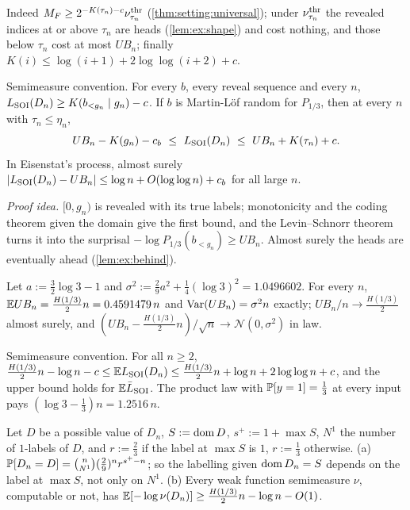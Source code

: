 Indeed $M_{F}\ge2^{-K(\tau_n)-c}\nu^{\rm thr}_{\tau_n}$ (\cref{thm:setting:universal}); under $\nu^{\rm thr}_{\tau_n}$ the revealed indices at or above $\tau_n$ are heads (\cref{lem:ex:shape}) and cost nothing, and those below $\tau_n$ cost at most $UB_n$; finally $K(i)\le\log(i+1)+2\log\log(i+2)+c$.

\begin{theorem}\label{thm:ex:sandwich}
Semimeasure convention. For every $b$, every reveal sequence and every $n$, $L_{\mathrm{SOI}}(D_n)\ge K(b_{<g_n}\mid g_n)-c$. If $b$ is Martin-L\"of random for $P_{1/3}$, then at every $n$ with $\tau_n\le\eta_n$,
\[UB_n-K(g_n)-c_b\ \le\ \LSFI(D_n)\ \le\ UB_n+K(\tau_n)+c.\]
In Eisenstat's process, almost surely $|L_{\mathrm{SOI}}(D_n)-UB_n|\le\log n+O(\log\log n)+c_b$ for all large $n$.
\end{theorem}

\emph{Proof idea.} $[0,g_n)$ is revealed with its true labels; monotonicity and the coding theorem given the domain give the first bound, and the Levin--Schnorr theorem turns it into the surprisal $-\log P_{1/3}(b_{<g_n})\ge UB_n$. Almost surely the heads are eventually ahead (\cref{lem:ex:behind}).

\begin{proposition}\label{prop:ex:asymp}
Let $a:=\frac32\log3-1$ and $\sigma^2:=\frac29a^2+\frac14(\log3)^2=1.0496602$. For every $n$, $\mathbb{E} UB_n=\frac{H(1/3)}2n=0.4591479\,n$ and $\operatorname{Var}(UB_n)=\sigma^2n$ exactly; $UB_n/n\to\frac{H(1/3)}2$ almost surely, and $(UB_n-\frac{H(1/3)}2n)/\sqrt n\to\mathcal N(0,\sigma^2)$ in law.
\end{proposition}

\begin{theorem}\label{thm:ex:expected}
Semimeasure convention. For all $n\ge2$,
$\frac{H(1/3)}2n-\log n-c\le\mathbb{E}L_{\mathrm{SOI}}(D_n)\le\frac{H(1/3)}2n+\log n+2\log\log n+c$, and the upper bound holds for $\mathbb{E}\bar{L}_{\mathrm{SOI}}$. The product law with $\mathbb{P}[y=1]=\frac13$ at every input pays $(\log3-\frac13)n=1.2516\,n$.
\end{theorem}

\begin{proposition}\label{prop:ex:law}
Let $D$ be a possible value of $D_n$, $S:=\operatorname{dom} D$, $s^+:=1+\max S$, $N^1$ the number of $1$-labels of $D$, and $r:=\frac23$ if the label at $\max S$ is $1$, $r:=\frac13$ otherwise.
(a) $\mathbb{P}[D_n=D]=\binom n{N^1}(\frac29)^nr^{s^+-n}$; so the labelling given $\operatorname{dom} D_n=S$ depends on the label at $\max S$, not only on $N^1$.
(b) Every weak function semimeasure $\nu$, computable or not, has $\mathbb{E}[-\log\nu(D_n)]\ge\frac{H(1/3)}2n-\log n-O(1)$.
\end{proposition}

